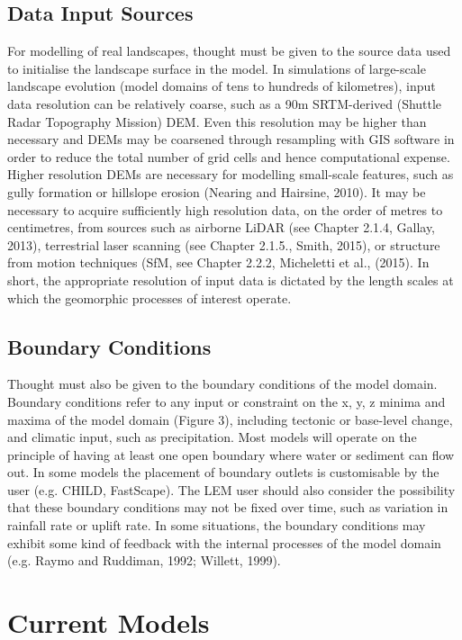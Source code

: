 \subsection{Data Input Sources}

For modelling of real landscapes, thought must be given to the source data used to initialise the landscape surface in the model. In simulations of large-scale landscape evolution (model domains of tens to hundreds of kilometres), input data resolution can be relatively coarse, such as a 90m SRTM-derived (Shuttle Radar Topography Mission) DEM. Even this resolution may be higher than necessary and DEMs may be coarsened through resampling with GIS software in order to reduce the total number of grid cells and hence computational expense. Higher resolution DEMs are necessary for modelling small-scale features, such as gully formation or hillslope erosion (Nearing and Hairsine, 2010). It may be necessary to acquire sufficiently high resolution data, on the order of metres to centimetres, from sources such as airborne LiDAR (see Chapter 2.1.4, Gallay, 2013), terrestrial laser scanning (see Chapter 2.1.5., Smith, 2015), or structure from motion techniques (SfM, see Chapter 2.2.2, Micheletti et al., (2015). In short, the appropriate resolution of input data is dictated by the length scales at which the geomorphic processes of interest operate.

\subsection{Boundary Conditions}
Thought must also be given to the boundary conditions of the model domain. Boundary conditions refer to any input or constraint on the x, y, z minima and maxima of the model domain (Figure 3), including tectonic or base-level change, and climatic input, such as precipitation. Most models will operate on the principle of having at least one open boundary where water or sediment can flow out. In some models the placement of boundary outlets is customisable by the user (e.g. CHILD, FastScape). The LEM user should also consider the possibility that these boundary conditions may not be fixed over time, such as variation in rainfall rate or uplift rate. In some situations, the boundary conditions may exhibit some kind of feedback with the internal processes of the model domain (e.g. Raymo and Ruddiman, 1992; Willett, 1999).

\section{Current Models}

